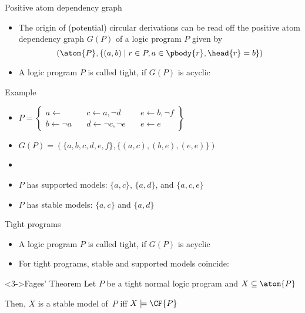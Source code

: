 \begin{frame}{Positive atom dependency graph}
  \bigskip
  \begin{itemize}
  \item<1->
    The origin of (potential) circular derivations can be read off the
    \alert{positive atom dependency graph} $G(P)$ of a logic program $P$
    given by
    \[
    (\atom{P}, \{(a,b) \mid r\in P, a \in \pbody{r}, \head{r}=b\})
    \]
  \item<2-> A logic program $P$ is called \alert{tight}, if $G(P)$ is acyclic
  \end{itemize}
\end{frame}
\begin{frame}[c]{Example}
  \bigskip
  \begin{itemize}
  \item<1->
  \(
  P
  =
  \left\{
    \begin{array}{lll}
      a \leftarrow                  \quad &
      c \leftarrow a, \neg d       \quad &
      e \leftarrow b, \neg f
      \\
      b \leftarrow \neg a          \quad &
      d \leftarrow \neg c, \neg e \quad &
      e \leftarrow e
    \end{array}
  \right\}
  \)
  \medskip
  \item<2->
    \(
    G(P)= (\{a,b,c,d,e,f\},\{(a,c),(b,e),(e,e)\})
    \)
  \item<3-> []
    \begin{center}
    
    \end{center}
  \item<4-> $P$ has supported models: $\{a,c\}$, $\{a,d\}$, and $\{a,c,e\}$
  \item<4-> $P$ has stable    models: $\{a,c\}$ and $\{a,d\}$
\end{itemize}
\end{frame}
\begin{frame}{Tight programs}
  \bigskip
  \begin{itemize}
  \item<1-> A logic program $P$ is called \alert{tight}, if $G(P)$ is acyclic
    \medskip
  \item<2-> For tight programs, stable and supported models coincide\pause[3]:
  \end{itemize}
  \bigskip
  \begin{block}<3->{Fages' Theorem}
    Let $P$ be a tight normal logic program and $X\subseteq\atom{P}$

    Then, $X$ is a stable model of~$P$ iff $X\models\CF{P}$
  \end{block}
\end{frame}
